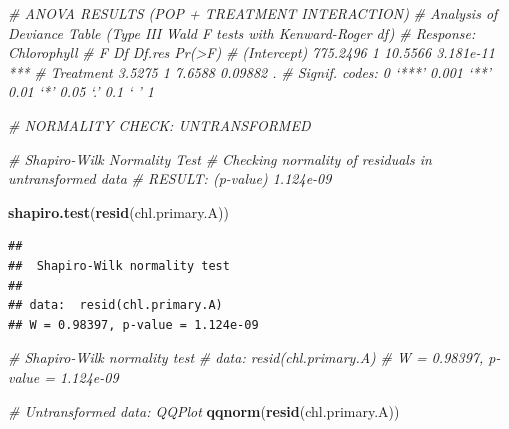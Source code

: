 \documentclass[
]{article}
\newenvironment{Shaded}{\begin{snugshade}}{\end{snugshade}}
\newcommand{\CommentTok}[1]{\textcolor[rgb]{0.56,0.35,0.01}{\textit{#1}}}
\newcommand{\FunctionTok}[1]{\textcolor[rgb]{0.13,0.29,0.53}{\textbf{#1}}}
\newcommand{\NormalTok}[1]{#1}
\begin{document}
\begin{Shaded}
\begin{Highlighting}[]
\CommentTok{\# ANOVA RESULTS (POP + TREATMENT INTERACTION)}
\CommentTok{\# Analysis of Deviance Table (Type III Wald F tests with Kenward{-}Roger df)}
\CommentTok{\# Response: Chlorophyll}
                   \CommentTok{\# F Df  Df.res    Pr(\textgreater{}F)    }
\CommentTok{\# (Intercept) 775.2496  1 10.5566 3.181e{-}11 ***}
\CommentTok{\# Treatment     3.5275  1  7.6588   0.09882 .   }
\CommentTok{\# Signif. codes:  0 ‘***’ 0.001 ‘**’ 0.01 ‘*’ 0.05 ‘.’ 0.1 ‘ ’ 1}
\end{Highlighting}
\end{Shaded}

\begin{Shaded}
\begin{Highlighting}[]
\CommentTok{\# NORMALITY CHECK: UNTRANSFORMED  }
  
\CommentTok{\# Shapiro{-}Wilk Normality Test}
\CommentTok{\# Checking normality of residuals in untransformed data}
\CommentTok{\# RESULT: (p{-}value) 1.124e{-}09}

\FunctionTok{shapiro.test}\NormalTok{(}\FunctionTok{resid}\NormalTok{(chl.primary.A)) }
\end{Highlighting}
\end{Shaded}

\begin{verbatim}
## 
##  Shapiro-Wilk normality test
## 
## data:  resid(chl.primary.A)
## W = 0.98397, p-value = 1.124e-09
\end{verbatim}

\begin{Shaded}
\begin{Highlighting}[]
\CommentTok{\# Shapiro{-}Wilk normality test}
\CommentTok{\# data:  resid(chl.primary.A)}
\CommentTok{\# W = 0.98397, p{-}value = 1.124e{-}09}
\end{Highlighting}
\end{Shaded}

\begin{Shaded}
\begin{Highlighting}[]
\CommentTok{\# Untransformed data: QQPlot  }
\FunctionTok{qqnorm}\NormalTok{(}\FunctionTok{resid}\NormalTok{(chl.primary.A))}
\end{Highlighting}
\end{Shaded}
\end{document}
